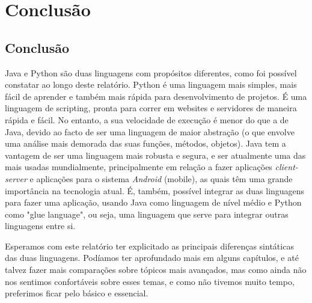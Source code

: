 \documentclass[11pt,openright,twoside]{report}
\begin{document}
\part{Conclusão}

\chapter{Conclusão}
Java e Python são duas linguagens com propósitos diferentes, como foi possível constatar ao longo deste relatório. Python é uma linguagem mais simples, mais fácil de aprender e também mais rápida para desenvolvimento de projetos. É uma linguagem de scripting, pronta para correr em websites e servidores de maneira rápida e fácil. No entanto, a sua velocidade de execução é menor do que a de Java, devido ao facto de ser uma linguagem de maior abstração (o que envolve uma análise mais demorada das suas funções, métodos, objetos). Java tem a vantagem de ser uma linguagem mais robusta e segura, e ser atualmente uma das mais usadas mundialmente, principalmente em relação a fazer aplicações \textit{client-server} e aplicações para o sistema \textit{Android} (mobile), as quais têm uma grande importância na tecnologia atual. É, também, possível integrar as duas linguagens para fazer uma aplicação, usando Java como linguagem de nível médio e Python como "glue language", ou seja, uma linguagem que serve para integrar outras linguagens entre si.

Esperamos com este relatório ter explicitado as principais diferenças sintáticas das duas linguagens. Podíamos ter aprofundado mais em alguns capítulos, e até talvez fazer mais comparações sobre tópicos mais avançados, mas como ainda não nos sentimos confortáveis sobre esses temas, e como não tivemos muito tempo, preferimos ficar pelo básico e essencial.



\end{document}
